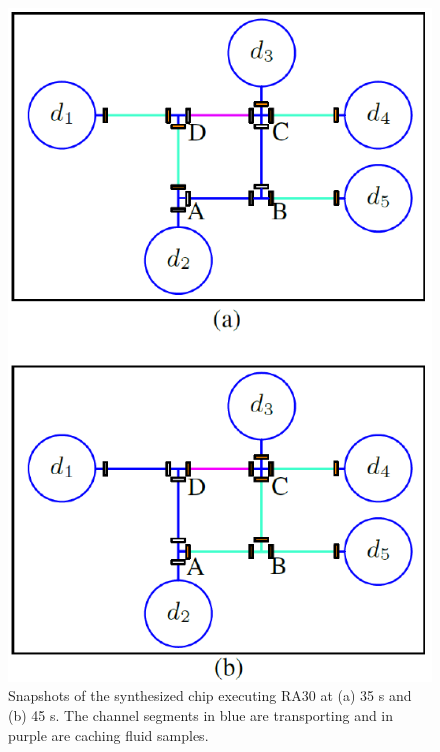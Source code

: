 \begin{figure}[t]
    \centering
    \includegraphics[width=0.6\linewidth]{Visio/RA30_exe_flow.pdf}
  \caption{Snapshots of the synthesized chip executing RA30 at (a) 35 s and (b) 45 s. The channel segments in blue are transporting and in purple are caching fluid samples.}
      \label{fig:RA30_exe_1}
\end{figure}

